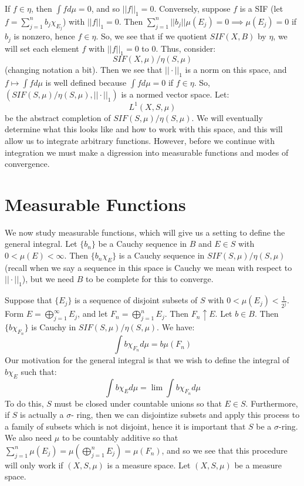 \documentclass[11pt, oneside]{amsart}   	%
\theoremstyle{definition}
\begin{document}
	If $f\in\eta$, then $\int fd\mu = 0$, and so $||f||_1 = 0$. Conversely, suppose $f$ is a SIF (let $f = \sum_{j = 1}^n b_j
	\chi_{E_j}$) with $||f||_1 = 0$. Then $\sum_{j = 1}^n ||b_j||\mu(E_j) = 0\implies\mu(E_j) = 0$ if $b_j$ is nonzero, hence 
	$f\in\eta$. So, we see that if we quotient $SIF(X, B)$ by $\eta$, we will set each element $f$ with $||f||_1 = 0$ to $0$. 
	Thus, consider:
	$$
		SIF(X, \mu) / \eta(S, \mu)
	$$
	(changing notation a bit). Then we see that $||\cdot||_1$ is a norm on this space, and $f\mapsto\int fd\mu$ is 
	well defined because $\int fd\mu = 0$ if $f\in\eta$. So, $(SIF(S, \mu) / \eta(S, \mu), ||\cdot||_1)$ is a normed vector space.
	Let:
	$$
		L^1(X, S, \mu)
	$$
	be the abstract completion of $SIF(S, \mu) / \eta(S, \mu)$. We will eventually determine what this looks like and how to 
	work with this space, and this will allow us to integrate arbitrary functions. However, before we continue with integration 
	we must make a digression into measurable functions and modes of convergence. 
	
	\section{Measurable Functions}
	
	We now study measurable functions, which will give us a setting to define the general integral. Let $\{b_n\}$ be a 
	Cauchy sequence in $B$ and $E\in S$ with $0 < \mu(E) < \infty$. Then $\{b_n\chi_E\}$ is a Cauchy sequence in 
	$SIF(S, \mu) / \eta(S, \mu)$ (recall when we say a sequence in this space is Cauchy we mean with respect to 
	$||\cdot||_1$), but we need $B$ to be complete for this to converge. 
	
	Suppose that $\{E_j\}$ is a sequence of disjoint subsets of $S$ with $0 < \mu(E_j) < \frac{1}{2^j}$. Form $E = 
	\bigoplus_{j = 1}^\infty E_j$, and let $F_n = \bigoplus_{j = 1}^n E_j$. Then $F_n\uparrow E$. Let $b\in B$. Then 
	$\{b\chi_{F_n}\}$ is Cauchy in $SIF(S, \mu) / \eta(S, \mu)$. We have:
	$$
		\int b\chi_{F_n}d\mu = b\mu(F_n)
	$$
	Our motivation for the general integral is that we wish to define the integral of $b\chi_E$ such that:
	$$
		\int b\chi_Ed\mu = \lim\int b\chi_{F_n}d\mu
	$$
	To do this, $S$ must be closed under countable unions so that $E\in S$. Furthermore, if $S$ is actually a $\sigma$-
	ring, then we can disjointize subsets and apply this process to a family of subsets which is not disjoint, hence it is 
	important that $S$ be a $\sigma$-ring. We also need $\mu$ to be countably additive so that $\sum_{j = 1}^n\mu(E_j) = 
	\mu(\bigoplus_{j =1}^n E_j) = \mu(F_n)$, and so we see that this procedure will only work if $(X, S, \mu)$ is a measure 
	space. Let $(X, S, \mu)$ be a measure space.
	
\end{document}
